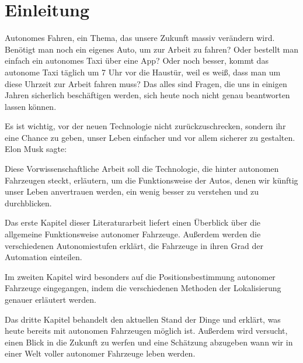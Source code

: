 \chapter{Einleitung}

Autonomes Fahren, ein Thema, das unsere Zukunft massiv verändern wird. Benötigt man noch ein eigenes Auto, um zur Arbeit zu fahren? Oder bestellt man einfach ein autonomes Taxi über eine App? Oder noch besser, kommt das autonome Taxi täglich um 7 Uhr vor die Haustür, weil es weiß, dass man um diese Uhrzeit zur Arbeit fahren muss? Das alles sind Fragen, die uns in einigen Jahren sicherlich beschäftigen werden, sich heute noch nicht genau beantworten lassen können.

Es ist wichtig, vor der neuen Technologie nicht zurückzuschrecken, sondern ihr eine Chance zu geben, unser Leben einfacher und vor allem sicherer zu gestalten. Elon Musk sagte: \textit{}

\bigskip

Diese Vorwissenschaftliche Arbeit soll die Technologie, die hinter autonomen Fahrzeugen steckt, erläutern, um die Funktionsweise der Autos, denen wir künftig unser Leben anvertrauen werden, ein wenig besser zu verstehen und zu durchblicken.

Das erste Kapitel dieser Literaturarbeit liefert einen Überblick über die allgemeine Funktionsweise autonomer Fahrzeuge. Außerdem werden die verschiedenen Autonomiestufen erklärt, die Fahrzeuge in ihren Grad der Automation einteilen.

Im zweiten Kapitel wird besonders auf die Positionsbestimmung autonomer Fahrzeuge eingegangen, indem die verschiedenen Methoden der Lokalisierung genauer erläutert werden.

Das dritte Kapitel behandelt den aktuellen Stand der Dinge und erklärt, was heute bereits mit autonomen Fahrzeugen möglich ist. Außerdem wird versucht, einen Blick in die Zukunft zu werfen und eine Schätzung abzugeben wann wir in einer Welt voller autonomer Fahrzeuge leben werden.
